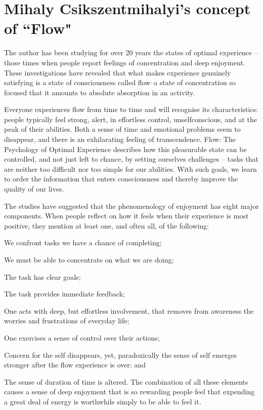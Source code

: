\section{Mihaly Csikszentmihalyi's concept of ``Flow"}
\label{sec:flow}

The author has been studying for over 20 years the states of optimal experience -- those times when people report feelings of concentration and deep enjoyment. These investigations have revealed that what makes experience genuinely satisfying is a state of consciousness called flow--a state of concentration so focused that it amounts to absolute absorption in an activity. 

Everyone experiences flow from time to time and will recognise its characteristics: people typically feel strong, alert, in effortless control, unselfconscious, and at the peak of their abilities. Both a sense of time and emotional problems seem to disappear, and there is an exhilarating feeling of transcendence. Flow: The Psychology of Optimal Experience describes how this pleasurable state can be controlled, and not just left to chance, by setting ourselves challenges -- tasks that are neither too difficult nor too simple for our abilities. With such goals, we learn to order the information that enters consciousness and thereby improve the quality of our lives.

The studies have suggested that the phenomenology of enjoyment has eight major components. When people reflect on how it feels when their experience is most positive, they mention at least one, and often all, of the following:
\begin{compactitem}
\item We confront tasks we have a chance of completing;
\item We must be able to concentrate on what we are doing; 
\item The task has clear goals;
\item The task provides immediate feedback;
\item One acts with deep, but effortless involvement, that removes from awareness the worries and frustrations
of everyday life;
\item One exercises a sense of control over their actions;
\item Concern for the self disappears, yet, paradoxically
the sense of self emerges stronger after the flow experience is over; and
\item The sense of duration of time is altered.
The combination of all these elements causes a sense of deep enjoyment that is so rewarding people feel that expending a great deal of energy is worthwhile simply to be able to feel it.
\end{compactitem}


